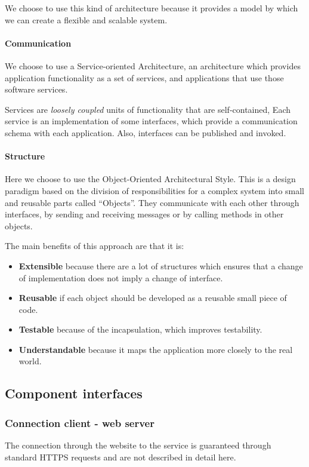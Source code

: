 We choose to use this kind of architecture because it provides a model by which
we can create a flexible and scalable system.

\paragraph{Communication} We choose to use a Service-oriented Architecture, 
an architecture which provides application functionality as a set of services, 
and applications that use those software services. 

Services are \textit{loosely coupled} units of functionality that are self-contained, 
Each service is an implementation of some interfaces, which provide a communication schema with
each application. Also, interfaces can be published and invoked.

\paragraph{Structure} Here we choose to use the Object-Oriented Architectural Style.
This is a design paradigm based on the division of responsibilities for a complex system
into small and reusable parts called ``Objects''.
They communicate with each other through interfaces, by sending and receiving messages
or by calling methods in other objects.

The main benefits of this approach are that it is:

\begin{itemize}
    \item{\textbf{Extensible} because there are a lot of structures which ensures that a change of implementation does not imply a change of interface.}
    \item{\textbf{Reusable} if each object should be developed as a reusable small piece of code.}
    \item{\textbf{Testable} because of the incapsulation, which improves testability.}
    \item{\textbf{Understandable} because it maps the application more closely to the real world.}
\end{itemize}

\newpage
\subsection{Component interfaces}
\label{sub:component_interfaces}

\subsubsection{Connection client - web server} %
\label{ssub:https}
The connection through the website to the service is guaranteed through standard HTTPS requests and are not described in detail here.

